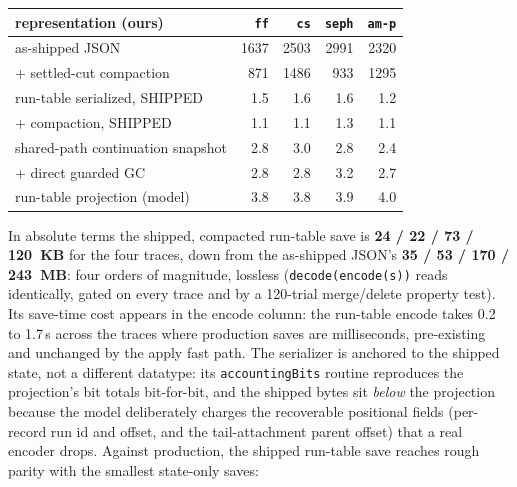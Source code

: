 \documentclass[11pt]{article}
\newcommand{\code}[1]{\texttt{#1}}
\begin{document}
\begin{center}\small
\begin{tabular}{@{}lrrrr@{}}
\toprule
representation (ours) & \code{ff} & \code{cs} & \code{seph} & \code{am-p} \\
\midrule
as-shipped JSON & 1637 & 2503 & 2991 & 2320 \\
\quad + settled-cut compaction & 871 & 1486 & 933 & 1295 \\
run-table serialized, SHIPPED & 1.5 & 1.6 & 1.6 & 1.2 \\
\quad + compaction, SHIPPED & 1.1 & 1.1 & 1.3 & 1.1 \\
shared-path continuation snapshot & 2.8 & 3.0 & 2.8 & 2.4 \\
\quad + direct guarded GC & 2.8 & 2.8 & 3.2 & 2.7 \\
run-table projection (model) & 3.8 & 3.8 & 3.9 & 4.0 \\
\bottomrule
\end{tabular}
\end{center}

\noindent In absolute terms the shipped, compacted run-table save is
\textbf{24 / 22 / 73 / 120~KB} for the four traces, down from the
as-shipped JSON's \textbf{35 / 53 / 170 / 243~MB}: four orders of
magnitude, lossless (\code{decode(encode(s))} reads identically, gated on
every trace and by a 120-trial merge/delete property test). Its
save-time cost appears in the encode column: the run-table encode takes 0.2 to
1.7\,s across the traces where production saves are milliseconds,
pre-existing and unchanged by the apply fast path. The
serializer is anchored to the shipped state, not a different datatype:
its \code{accountingBits} routine reproduces the projection's bit totals
bit-for-bit, and the shipped bytes sit \emph{below} the projection
because the model deliberately charges the recoverable positional fields
(per-record run id and offset, and the tail-attachment parent offset)
that a real encoder drops. Against production, the shipped run-table save
reaches rough parity with the smallest state-only saves:
\end{document}
